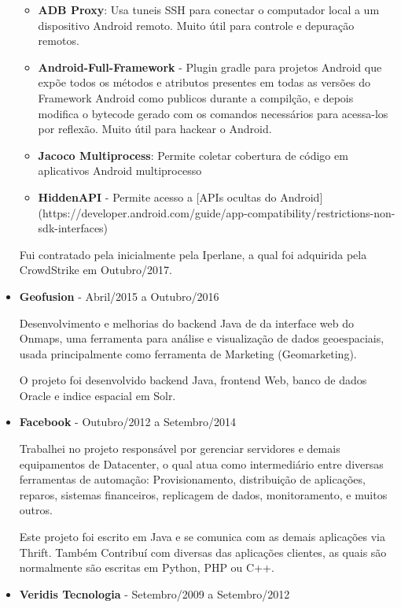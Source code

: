 \documentclass[a4paper,10pt]{article}
\begin{document}
\begin{itemize}
        \begin{itemize}
          \item \textbf{ADB Proxy}: Usa tuneis SSH para conectar o computador local a um dispositivo Android remoto. Muito útil para controle e depuração remotos.
          \item \textbf{Android-Full-Framework} - Plugin gradle para projetos Android que expõe todos os métodos e atributos presentes em todas as versões do Framework Android como publicos durante a compilção, e depois modifica o bytecode gerado com os comandos necessários para acessa-los por reflexão. Muito útil para hackear o Android.
          \item \textbf{Jacoco Multiprocess}: Permite coletar cobertura de código em aplicativos Android multiprocesso
          \item \textbf{HiddenAPI} - Permite acesso a [APIs ocultas do Android](https://developer.android.com/guide/app-compatibility/restrictions-non-sdk-interfaces)
        \end{itemize}

        Fui contratado pela inicialmente pela Iperlane, a qual foi adquirida pela CrowdStrike em Outubro/2017.

      \item
        \textbf{Geofusion} - Abril/2015 a Outubro/2016

        Desenvolvimento e melhorias do backend Java de da interface web do Onmaps, uma ferramenta para análise e visualização de dados geoespaciais, usada principalmente como ferramenta de Marketing (Geomarketing).
        
        O projeto foi desenvolvido backend Java, frontend Web, banco de dados Oracle e indice espacial em Solr.

      \item
        \textbf{Facebook} - Outubro/2012 a Setembro/2014
        
        Trabalhei no projeto responsável por gerenciar servidores e demais equipamentos de Datacenter, o qual atua como intermediário entre diversas ferramentas de automação: Provisionamento, distribuição de aplicações, reparos, sistemas financeiros, replicagem de dados, monitoramento, e muitos outros.
        
        Este projeto foi escrito em Java e se comunica com as demais aplicações via Thrift. Também Contribuí com diversas das aplicações clientes, as quais são normalmente são escritas em Python, PHP ou C++.

      \item
        \textbf{Veridis Tecnologia} - Setembro/2009 a Setembro/2012


\end{itemize}
\end{document}
